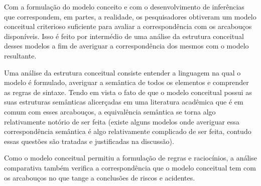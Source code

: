 Com a formulação do modelo conceito e com o desenvolvimento de inferências que correspondem, em partes, a realidade, os pesquisadores obtiveram um modelo conceitual criterioso suficiente para avaliar a correspondência com os arcabouços disponíveis. Isso é feito por intermédio de uma análise da estrutura conceitual desses modelos a fim de averiguar a correspondência dos mesmos com o modelo resultante.

Uma análise da estrutura conceitual consiste entender a linguagem na qual o modelo é formulado, averiguar a semântica de todos os elementos e comprender as regras de sintaxe. Tendo em vista o fato de que o modelo conceitual possui as suas estruturas semânticas alicerçadas em uma literatura acadêmica que é em comum com esses arcabouços, a equivalência semântica se torna algo relativamente notório de ser feita (existe alguns modelos onde averiguar essa correspondência semântica é algo relativamente complicado de ser feita, contudo essas questões são tratadas e justificadas na discussão).

Como o modelo conceitual permitiu a formulação de regras e raciocínios, a análise comparativa também verifica a correspondência que o modelo conceitual tem com os arcabouços no que tange a conclusões de riscos e acidentes.